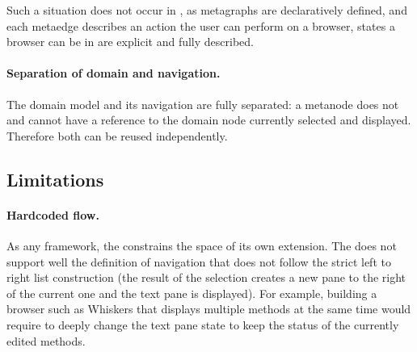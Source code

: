\documentclass[a4paper,10pt,twoside]{book}
\begin{document}
Such a situation does not occur in \obf, as metagraphs are declaratively defined, and each metaedge describes an action the user can perform on a browser, states a browser can be in are explicit and fully described.

\paragraph{Separation of domain and navigation.} The domain model and its navigation are fully separated: a metanode does not and cannot have a reference to the domain node currently selected and displayed. Therefore both can be reused independently.

\subsection{Limitations} 

\paragraph{Hardcoded flow.} As any framework, the \obf constrains the space of its own extension. The \obf does not support well the definition of navigation that does not follow the strict left  to right list construction (the result of the selection creates a new pane to the right of the current one and  the text pane is displayed). For example, building a browser such as Whiskers that displays multiple methods at the same time would require to deeply change the text pane state to keep the status of the currently edited methods. 


\end{document}
